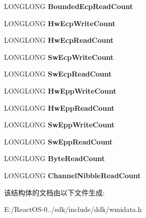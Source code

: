 \begin{DoxyCompactItemize}
L\+O\+N\+G\+L\+O\+NG {\bfseries Bounded\+Ecp\+Read\+Count}
\item 
\mbox{\label{struct___p_a_r_a_l_l_e_l___w_m_i___l_o_g___i_n_f_o_a07e790befd81ca534f46fa7dc1806818}} 
L\+O\+N\+G\+L\+O\+NG {\bfseries Hw\+Ecp\+Write\+Count}
\item 
\mbox{\label{struct___p_a_r_a_l_l_e_l___w_m_i___l_o_g___i_n_f_o_a0c44e75a3064306c04662b895d7cd576}} 
L\+O\+N\+G\+L\+O\+NG {\bfseries Hw\+Ecp\+Read\+Count}
\item 
\mbox{\label{struct___p_a_r_a_l_l_e_l___w_m_i___l_o_g___i_n_f_o_a7b0c2714407cf2d33e820d2285a629f2}} 
L\+O\+N\+G\+L\+O\+NG {\bfseries Sw\+Ecp\+Write\+Count}
\item 
\mbox{\label{struct___p_a_r_a_l_l_e_l___w_m_i___l_o_g___i_n_f_o_a3e721cd7486ecfff6a3da3ca18b9c012}} 
L\+O\+N\+G\+L\+O\+NG {\bfseries Sw\+Ecp\+Read\+Count}
\item 
\mbox{\label{struct___p_a_r_a_l_l_e_l___w_m_i___l_o_g___i_n_f_o_ad8bf7a0cecb8737a2a17d79da7fd6416}} 
L\+O\+N\+G\+L\+O\+NG {\bfseries Hw\+Epp\+Write\+Count}
\item 
\mbox{\label{struct___p_a_r_a_l_l_e_l___w_m_i___l_o_g___i_n_f_o_a504f5e2bd13279537b5633123ccb872b}} 
L\+O\+N\+G\+L\+O\+NG {\bfseries Hw\+Epp\+Read\+Count}
\item 
\mbox{\label{struct___p_a_r_a_l_l_e_l___w_m_i___l_o_g___i_n_f_o_a9e661be5861125be6e37001dc8bc1aa7}} 
L\+O\+N\+G\+L\+O\+NG {\bfseries Sw\+Epp\+Write\+Count}
\item 
\mbox{\label{struct___p_a_r_a_l_l_e_l___w_m_i___l_o_g___i_n_f_o_a99ac5001f9cddc414b99675cb12060eb}} 
L\+O\+N\+G\+L\+O\+NG {\bfseries Sw\+Epp\+Read\+Count}
\item 
\mbox{\label{struct___p_a_r_a_l_l_e_l___w_m_i___l_o_g___i_n_f_o_a3cc231a9518e1dde03bd3239681ecd4a}} 
L\+O\+N\+G\+L\+O\+NG {\bfseries Byte\+Read\+Count}
\item 
\mbox{\label{struct___p_a_r_a_l_l_e_l___w_m_i___l_o_g___i_n_f_o_a4f4942e212e843e9ed7d43ada9eb630f}} 
L\+O\+N\+G\+L\+O\+NG {\bfseries Channel\+Nibble\+Read\+Count}
\end{DoxyCompactItemize}


该结构体的文档由以下文件生成\+:\begin{DoxyCompactItemize}
\item 
E\+:/\+React\+O\+S-\/0../sdk/include/ddk/wmidata.\+h\end{DoxyCompactItemize}
